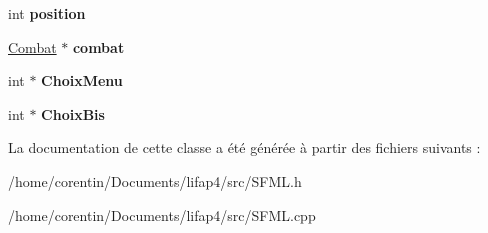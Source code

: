 \begin{DoxyCompactItemize}
int {\bfseries position}
\item 
\mbox{\label{class_aff_s_f_m_l_ae39ec30ffc0dd0a91cf6250c25a05e88}} 
\hyperlink{class_combat}{Combat} $\ast$ {\bfseries combat}
\item 
\mbox{\label{class_aff_s_f_m_l_a664dce9e99002aef9fc65ee8b148ab1d}} 
int $\ast$ {\bfseries Choix\+Menu}
\item 
\mbox{\label{class_aff_s_f_m_l_aad79cd393162e5d5a185cf4ff7fe9fd6}} 
int $\ast$ {\bfseries Choix\+Bis}
\end{DoxyCompactItemize}


La documentation de cette classe a été générée à partir des fichiers suivants \+:\begin{DoxyCompactItemize}
\item 
/home/corentin/\+Documents/lifap4/src/S\+F\+M\+L.\+h\item 
/home/corentin/\+Documents/lifap4/src/S\+F\+M\+L.\+cpp\end{DoxyCompactItemize}
